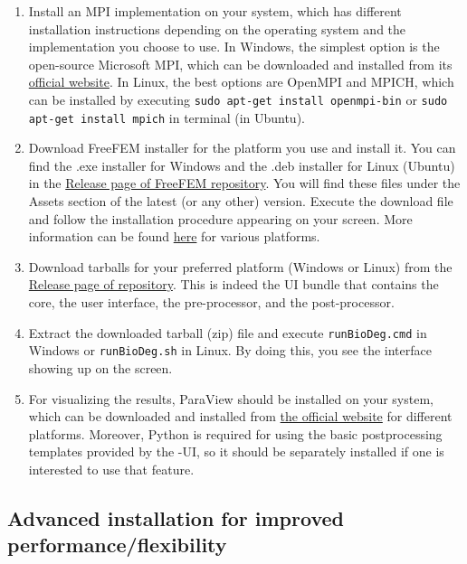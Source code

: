 \begin{enumerate}
\item
Install an MPI implementation on your system, which has different installation instructions depending on the operating system and the implementation you choose to use. In Windows, the simplest option is the open-source Microsoft MPI, which can be downloaded and installed from its \href{https://www.microsoft.com/en-us/download/details.aspx?id=100593}{official website}. In Linux, the best options are OpenMPI and MPICH, which can be installed by executing \verb|sudo apt-get install openmpi-bin| or \verb|sudo apt-get install mpich| in terminal (in Ubuntu).
\item
Download FreeFEM installer for the platform you use and install it. You can find the {.exe} installer for Windows and the {.deb} installer for Linux (Ubuntu) in the \href{https://github.com/FreeFem/FreeFem-sources/releases}{Release page of FreeFEM repository}. You will find these files under the Assets section of the latest (or any other) version. Execute the download file and follow the installation procedure appearing on your screen. More information can be found \href{https://doc.freefem.org/introduction/installation.html}{here} for various platforms.
\item
Download \biodeg{} tarballs for your preferred platform (Windows or Linux) from the \href{https://github.com/mbarzegary/BioDeg-UI/releases}{Release page of \biodeg{} repository}. This is indeed the \biodeg{} UI bundle that contains the \biodeg{} core, the user interface, the pre-processor, and the post-processor.
\item
Extract the downloaded tarball (zip) file and execute \verb|runBioDeg.cmd| in Windows or \verb|runBioDeg.sh| in Linux. By doing this, you see the \biodeg{} interface showing up on the screen.
\item
For visualizing the results, ParaView should be installed on your system, which can be downloaded and installed from \href{https://www.paraview.org/download/}{the official website} for different platforms. Moreover, Python is required for using the basic postprocessing templates provided by the \biodeg{}-UI, so it should be separately installed if one is interested to use that feature.
\end{enumerate}




\subsection{Advanced installation for improved performance/flexibility}

